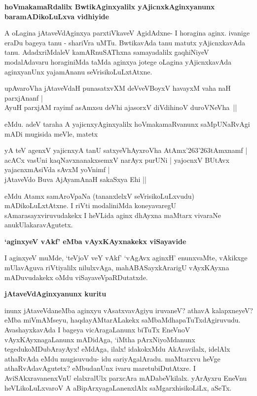 {\bigskip
\noindent
{\large\bf hoVmakamaRdalilx BwtikAginxyalilx yAjicnxkAginxyanunx baramADikoLuLxva vidhiyide}}\label{page211a}
\medskip

\noindent
A oLagina jAtaveVdAginxya parxtiVkaveV AgidAdxne- I horagina aginx. ivanige eraDu bageya tanu - shariVra uMTu. BwtikavAda tanu matutx yAjicnxkavAda tanu. AdadxriMdaleV kamARnuSAThxna samayadalilx gaqhiNiyeV modalAdavaru horaginiMda taMda aginxya jotege oLagina yAjicnxkavAda aginxyanUnx yajamAnanu seVrisikoLuLxtAtxne. 

\begin{shloka}
upAvaroVha jAtaveVdaH punasatxvXM deVveVBoyxV havayxM vaha naH parxjAnanf |\\\label{211}
AyuH parxjAM rayimf asAmxsu deVhi ajasorxV diVdihinoV duroVNeVha~||
\end{shloka}

\noindent
eMdu. adeV taraha A yajicnxyAginxyalilx hoVmakamaRvanunx saMpUNaRvAgi mADi mugisida meVle, matetx

\begin{shloka}
yA teV agenxV yajicnxyA tanU satxyeVhAyxroVha AtAmx\char'263\char'263tAmxnamf |\\\label{211a}
acACx vasUni kaqNavxnanakxsemxV narAyx purUNi | yajocnxV BUtAvx yajacnxmAsiVda sAvxM yoVnimf |\\
jAtaveVdo Buva AjAyamAnaH sakaSxya Ehi ||
\end{shloka}

\noindent
eMdu Atamx samAroVpaNa (tananxlelxV seVrisikoLuLxvudu) mADikoLuLxtAtxne. I riVti modaliniMda koneyavaregU sAmarasayxviruvudakekx I heVLida aginx dhAyxna maMtarx vivaraNe anukUlakaravAgutetx.

{\bigskip
\noindent
{\large\bf `aginxyeV vAkf' eMba vAyxKAyxnakekx viSayavide}}\label{page211b}
\medskip

\noindent
I aginxyeV muMde, `teVjoV veY vAkf'\label{212} `vAgAvx aginxH'\label{212a} enunxvaMte, vAkikxge mUlavAguva riVtiyalilx nilulxvAga, mahABASayxkArarigU vAyxKAyxna mADuvudakekx oMdu viSayaveVpaRDutatxde.

{\bigskip
\noindent
{\large\bf jAtaveVdAginxyanunx kuritu}}\label{page212}
\medskip

\noindent
inunx jAtaveVdaneMba aginxyu vAsatxvavAgiyu iruvaneV? athavA kalapxneyeV? eMba miVmAMseyu, haqdayAMtarALakekx saMbaMdhapaTuTxdAgiruvudu. AvashayxkavAda I bageya vicAragaLanunx biTuTx EneVnoV vAyxKAyxnagaLanunx mADidAga, `iMtha pArxNiyoMdanunx tegedukoMDubArayAyx! eMdAga, ilalx! idakokxMdu AkAravilalx, idelAlx athaRvAda eMdu mugisuvudu- idu sariyAgalAradu. maMtarxvu heVge athaRvAdavAgutetx? eMbudanUnx ivaru maretubiDutAtxre. I AviSAkxravanenxVnU elalxralUlx parxcAra mADabeVkilalx. yArAyxru EneVnu heVLikoLuLxvaroV A aBipArxyagaLanenxlAlx saMgarxhisikoLiLx, aSeTx.

